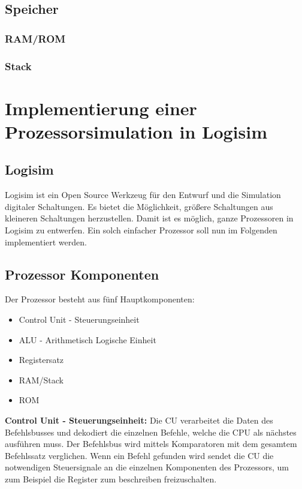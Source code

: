 \documentclass[12pt]{article}
\begin{document}
\subsection{Speicher}

\subsubsection{RAM/ROM}
\subsubsection{Stack}

\section{Implementierung einer Prozessorsimulation in Logisim}
\subsection{Logisim}
Logisim ist ein Open Source Werkzeug für den Entwurf und die Simulation digitaler Schaltungen. Es bietet die Möglichkeit, größere Schaltungen aus kleineren Schaltungen herzustellen. Damit ist es möglich, ganze Prozessoren in Logisim zu entwerfen. Ein solch einfacher Prozessor soll nun im Folgenden implementiert werden.
\subsection{Prozessor Komponenten}
Der Prozessor besteht aus fünf Hauptkomponenten:
\begin{itemize}
\item Control Unit - Steuerungseinheit
\item ALU - Arithmetisch Logische Einheit
\item Registersatz 
\item RAM/Stack
\item ROM
\end{itemize}

\textbf{Control Unit - Steuerungseinheit: } Die CU verarbeitet die Daten des Befehlsbusses und dekodiert die einzelnen Befehle, welche die CPU als nächstes ausführen muss. Der Befehlsbus wird mittels Komparatoren mit dem gesamtem Befehlssatz verglichen. Wenn ein Befehl gefunden wird sendet die CU die notwendigen Steuersignale an die einzelnen Komponenten des Prozessors, um zum Beispiel die Register zum beschreiben freizuschalten.
\end{document}
